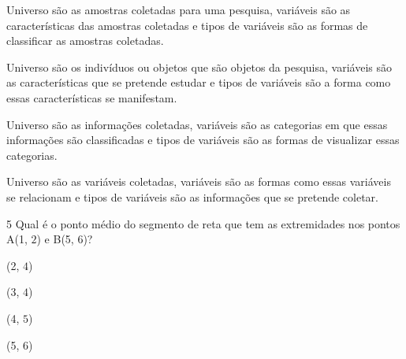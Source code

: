 \begin{escolha}
\item Universo são as amostras coletadas para uma pesquisa, variáveis são
as características das amostras coletadas e tipos de variáveis são as
formas de classificar as amostras coletadas.
\item Universo são os indivíduos ou objetos que são objetos da pesquisa,
variáveis são as características que se pretende estudar e tipos de
variáveis são a forma como essas características se manifestam.
\item Universo são as informações coletadas, variáveis são as categorias em
que essas informações são classificadas e tipos de variáveis são as
formas de visualizar essas categorias.
\item Universo são as variáveis coletadas, variáveis são as formas como
essas variáveis se relacionam e tipos de variáveis são as informações
que se pretende coletar.
\end{escolha}



\num{5}  Qual é o ponto médio do segmento de reta que tem as extremidades nos
pontos A(1, $2$) e B(5, $6$)?

\begin{escolha}
\item (2, $4$)
\item (3, $4$)
\item (4, $5$)
\item (5, $6$)
\end{escolha}



